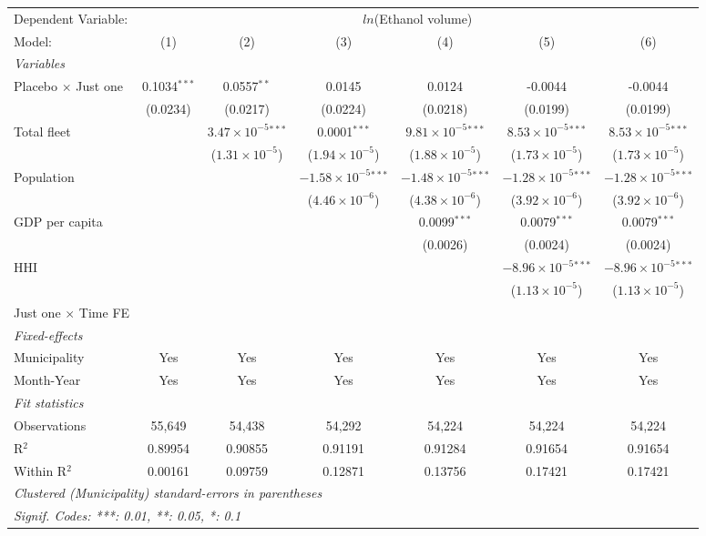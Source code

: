 \documentclass[
]{article}
\begin{document}
\begin{tabular}{lcccccc}
\tabularnewline\midrule\midrule
Dependent Variable:&\multicolumn{6}{c}{$ln$(Ethanol volume)}\\
Model:&(1) & (2) & (3) & (4) & (5) & (6)\\
\midrule \emph{Variables}&   &   &   &   &   &  \\
Placebo $\times $ Just one & 0.1034$^{***}$ & 0.0557$^{**}$ & 0.0145 & 0.0124 & -0.0044 & -0.0044\\
  &(0.0234) & (0.0217) & (0.0224) & (0.0218) & (0.0199) & (0.0199)\\
Total fleet &    & $3.47\times 10^{-5}$$^{***}$ & 0.0001$^{***}$ & $9.81\times 10^{-5}$$^{***}$ & $8.53\times 10^{-5}$$^{***}$ & $8.53\times 10^{-5}$$^{***}$\\
  &   & ($1.31\times 10^{-5}$) & ($1.94\times 10^{-5}$) & ($1.88\times 10^{-5}$) & ($1.73\times 10^{-5}$) & ($1.73\times 10^{-5}$)\\
Population &    &    & $-1.58\times 10^{-5}$$^{***}$ & $-1.48\times 10^{-5}$$^{***}$ & $-1.28\times 10^{-5}$$^{***}$ & $-1.28\times 10^{-5}$$^{***}$\\
  &   &    & ($4.46\times 10^{-6}$) & ($4.38\times 10^{-6}$) & ($3.92\times 10^{-6}$) & ($3.92\times 10^{-6}$)\\
GDP per capita &    &    &    & 0.0099$^{***}$ & 0.0079$^{***}$ & 0.0079$^{***}$\\
  &   &    &    & (0.0026) & (0.0024) & (0.0024)\\
HHI &    &    &    &    & $-8.96\times 10^{-5}$$^{***}$ & $-8.96\times 10^{-5}$$^{***}$\\
  &   &    &    &    & ($1.13\times 10^{-5}$) & ($1.13\times 10^{-5}$)\\
Just one $\times$ Time FE &  &  &  &  &  & \\
\midrule \emph{Fixed-effects}&   &   &   &   &   &  \\
Municipality & Yes & Yes & Yes & Yes & Yes & Yes\\
Month-Year & Yes & Yes & Yes & Yes & Yes & Yes\\
\midrule \emph{Fit statistics}&  & & & & & \\
Observations & 55,649&54,438&54,292&54,224&54,224&54,224\\
R$^2$ & 0.89954&0.90855&0.91191&0.91284&0.91654&0.91654\\
Within R$^2$ & 0.00161&0.09759&0.12871&0.13756&0.17421&0.17421\\
\midrule\midrule\multicolumn{7}{l}{\emph{Clustered (Municipality) standard-errors in parentheses}}\\
\multicolumn{7}{l}{\emph{Signif. Codes: ***: 0.01, **: 0.05, *: 0.1}}\\
\end{tabular}
\end{document}
